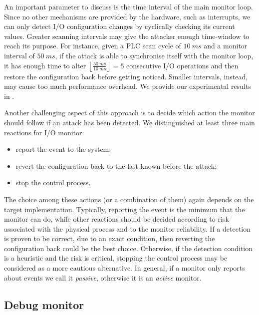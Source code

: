 An important parameter to discuss is the time interval of the main monitor loop. Since no other mechanisms are provided by the hardware,
such as interrupts, we can only detect I/O configuration changes by cyclically checking its current values. Greater scanning intervals may give the attacker
enough time-window to reach its purpose. For instance, given a PLC scan cycle of $\SI{10}{ms}$ and a monitor interval of $\SI{50}{ms}$,
if the attack is able to synchronise itself with the monitor loop, it has enough time to alter $\left \lfloor{\frac{\SI{50}{ms}}{\SI{10}{ms}}}\right \rfloor = 5$
consecutive I/O operations and then restore the configuration back before getting noticed. Smaller intervals, instead, may cause too much performance overhead.
We provide our experimental results in .

Another challenging aspect of this approach is to decide which action the monitor should follow if an attack has been detected.
We distinguished at least three main reactions for I/O monitor:
\begin{itemize}
	\item report the event to the system;
	\item revert the configuration back to the last known before the attack;
	\item stop the control process.
\end{itemize}
The choice among these actions (or a combination of them) again depends on the target implementation.
Typically, reporting the event is the minimum that the monitor can do, while other reactions should be decided according to risk associated with the physical process
and to the monitor reliability. If a detection is proven to be correct, due to an exact condition,
then reverting the configuration back could be the best choice. Otherwise, if the detection condition is a heuristic and the risk is critical,
stopping the control process may be considered as a more cautious alternative.
In general, if a monitor only reports about events we call it \emph{passive}, otherwise it is an \emph{active} monitor.


\subsection{Debug monitor}
\label{sec:dr_design}

